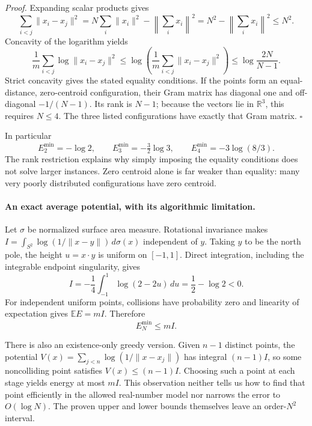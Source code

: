 \documentclass[11pt]{article}
\begin{document}
\emph{Proof.} Expanding scalar products gives
\[
 \sum_{i<j}\|x_i-x_j\|^2
 =N\sum_i\|x_i\|^2-\left\|\sum_i x_i\right\|^2
 =N^2-\left\|\sum_i x_i\right\|^2\le N^2.
\]
Concavity of the logarithm yields
\[
 \frac1m\sum_{i<j}\log\|x_i-x_j\|^2
 \le\log\left(\frac1m\sum_{i<j}\|x_i-x_j\|^2\right)
 \le\log\frac{2N}{N-1}.
\]
Strict concavity gives the stated equality conditions. If the points
form an equal-distance, zero-centroid configuration, their Gram matrix
has diagonal one and off-diagonal $-1/(N-1)$. Its rank is $N-1$;
because the vectors lie in $\mathbb R^3$, this requires $N\le4$.
The three listed configurations have exactly that Gram matrix.
\hfill$\square$

In particular
\[
 E_2^{\min}=-\log2,\qquad E_3^{\min}=-\tfrac32\log3,
 \qquad E_4^{\min}=-3\log(8/3).
\]
The rank restriction explains why simply imposing the equality conditions
does not solve larger instances. Zero centroid alone is far weaker than
equality: many very poorly distributed configurations have zero centroid.

\paragraph{An exact average potential, with its algorithmic limitation.}
Let $\sigma$ be normalized surface area measure. Rotational invariance
makes $I=\int_{S^2}\log(1/\|x-y\|)\,d\sigma(x)$ independent of $y$.
Taking $y$ to be the north pole, the height $u=x\cdot y$ is uniform on
$[-1,1]$. Direct integration, including the integrable endpoint singularity,
gives
\begin{equation}\label{a474:average}
 I=-\frac14\int_{-1}^1\log(2-2u)\,du
   =\frac12-\log2<0.
\end{equation}
For independent uniform points, collisions have probability zero and
linearity of expectation gives $\mathbb E E=mI$. Therefore
\begin{equation}\label{a474:upper}
 E_N^{\min}\le mI.
\end{equation}

There is also an existence-only greedy version. Given $n-1$ distinct
points, the potential $V(x)=\sum_{j<n}\log(1/\|x-x_j\|)$ has integral
$(n-1)I$, so some noncolliding point satisfies $V(x)\le(n-1)I$.
Choosing such a point at each stage yields energy at most $mI$.
This observation neither tells us how to find that point efficiently in
the allowed real-number model nor narrows the error to $O(\log N)$.
The proven upper and lower bounds themselves leave an order-$N^2$ interval.
\end{document}

